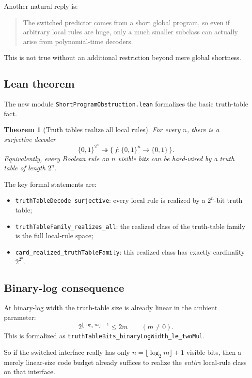 \documentclass[11pt]{article}
\newtheorem{theorem}{Theorem}[section]
\theoremstyle{remark}
\begin{document}
Another natural reply is:
\begin{quote}
The switched predictor comes from a short global program, so even if arbitrary local rules are
huge, only a much smaller subclass can actually arise from polynomial-time decoders.
\end{quote}

This is not true without an additional restriction beyond mere global shortness.

\subsection{Lean theorem}

The new module \texttt{ShortProgramObstruction.lean} formalizes the basic truth-table fact.

\begin{theorem}[Truth tables realize all local rules]
For every \(n\), there is a surjective decoder
\[
  \{0,1\}^{2^n} \twoheadrightarrow \{\,f : \{0,1\}^n \to \{0,1\}\,\}.
\]
Equivalently, every Boolean rule on \(n\) visible bits can be hard-wired by a truth table of
length \(2^n\).
\end{theorem}

\noindent
The key formal statements are:
\begin{itemize}[leftmargin=1.5em]
  \item \texttt{truthTableDecode\_surjective}: every local rule is realized by a
  \(2^n\)-bit truth table;
  \item \texttt{truthTableFamily\_realizes\_all}: the realized class of the truth-table family is
  the full local-rule space;
  \item \texttt{card\_realized\_truthTableFamily}: this realized class has exactly cardinality
  \(2^{2^n}\).
\end{itemize}

\subsection{Binary-log consequence}

At binary-log width the truth-table size is already linear in the ambient parameter:
\[
  2^{\lfloor \log_2 m \rfloor + 1} \le 2m \qquad (m \ne 0).
\]
This is formalized as
\texttt{truthTableBits\_binaryLogWidth\_le\_twoMul}.

So if the switched interface really has only \(n = \lfloor \log_2 m \rfloor + 1\) visible bits,
then a merely linear-size code budget already suffices to realize the \emph{entire} local-rule
class on that interface.
\end{document}
